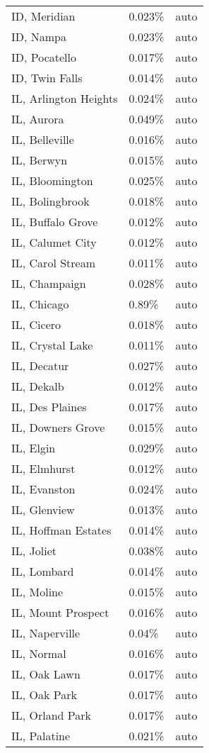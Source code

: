 \begin{longtable}[]{@{}lll@{}}
ID, Meridian & 0.023\% & auto \\
ID, Nampa & 0.023\% & auto \\
ID, Pocatello & 0.017\% & auto \\
ID, Twin Falls & 0.014\% & auto \\
IL, Arlington Heights & 0.024\% & auto \\
IL, Aurora & 0.049\% & auto \\
IL, Belleville & 0.016\% & auto \\
IL, Berwyn & 0.015\% & auto \\
IL, Bloomington & 0.025\% & auto \\
IL, Bolingbrook & 0.018\% & auto \\
IL, Buffalo Grove & 0.012\% & auto \\
IL, Calumet City & 0.012\% & auto \\
IL, Carol Stream & 0.011\% & auto \\
IL, Champaign & 0.028\% & auto \\
IL, Chicago & 0.89\% & auto \\
IL, Cicero & 0.018\% & auto \\
IL, Crystal Lake & 0.011\% & auto \\
IL, Decatur & 0.027\% & auto \\
IL, Dekalb & 0.012\% & auto \\
IL, Des Plaines & 0.017\% & auto \\
IL, Downers Grove & 0.015\% & auto \\
IL, Elgin & 0.029\% & auto \\
IL, Elmhurst & 0.012\% & auto \\
IL, Evanston & 0.024\% & auto \\
IL, Glenview & 0.013\% & auto \\
IL, Hoffman Estates & 0.014\% & auto \\
IL, Joliet & 0.038\% & auto \\
IL, Lombard & 0.014\% & auto \\
IL, Moline & 0.015\% & auto \\
IL, Mount Prospect & 0.016\% & auto \\
IL, Naperville & 0.04\% & auto \\
IL, Normal & 0.016\% & auto \\
IL, Oak Lawn & 0.017\% & auto \\
IL, Oak Park & 0.017\% & auto \\
IL, Orland Park & 0.017\% & auto \\
IL, Palatine & 0.021\% & auto \\

\end{longtable}
